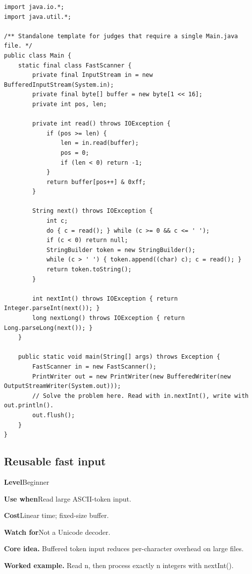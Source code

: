 \documentclass[10pt,letterpaper]{article}
\newcommand{\entrylabel}[1]{\textcolor{accent}{\bfseries #1}}
\begin{document}
\begin{lstlisting}
import java.io.*;
import java.util.*;

/** Standalone template for judges that require a single Main.java file. */
public class Main {
    static final class FastScanner {
        private final InputStream in = new BufferedInputStream(System.in);
        private final byte[] buffer = new byte[1 << 16];
        private int pos, len;

        private int read() throws IOException {
            if (pos >= len) {
                len = in.read(buffer);
                pos = 0;
                if (len < 0) return -1;
            }
            return buffer[pos++] & 0xff;
        }

        String next() throws IOException {
            int c;
            do { c = read(); } while (c >= 0 && c <= ' ');
            if (c < 0) return null;
            StringBuilder token = new StringBuilder();
            while (c > ' ') { token.append((char) c); c = read(); }
            return token.toString();
        }

        int nextInt() throws IOException { return Integer.parseInt(next()); }
        long nextLong() throws IOException { return Long.parseLong(next()); }
    }

    public static void main(String[] args) throws Exception {
        FastScanner in = new FastScanner();
        PrintWriter out = new PrintWriter(new BufferedWriter(new OutputStreamWriter(System.out)));
        // Solve the problem here. Read with in.nextInt(), write with out.println().
        out.flush();
    }
}
\end{lstlisting}
\subsection{Reusable fast input}
\begin{guidebox}\small
\entrylabel{Level}\quad Beginner\par
\entrylabel{Use when}\quad Read large ASCII-token input.\par
\entrylabel{Cost}\quad Linear time; fixed-size buffer.\par
\entrylabel{Watch for}\quad Not a Unicode decoder.\par
\end{guidebox}
\noindent\textbf{Core idea.} Buffered token input reduces per-character overhead on large files.\par
\noindent\textbf{Worked example.} Read n, then process exactly n integers with nextInt().\par
\end{document}
